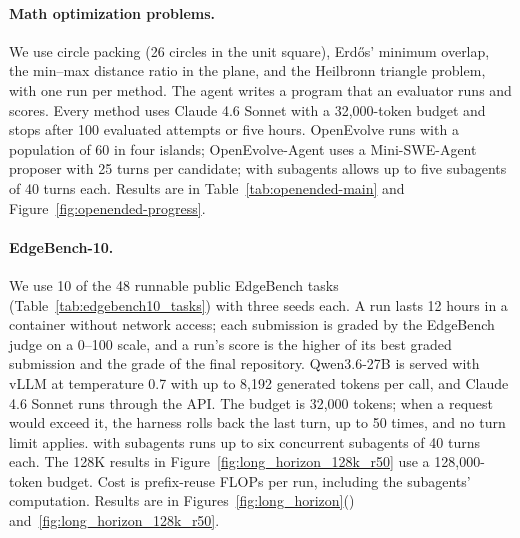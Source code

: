 \paragraph{Math optimization problems.}
We use circle packing (26 circles in the unit square), Erd\H{o}s' minimum overlap, the min--max distance ratio in the plane, and the Heilbronn triangle problem, with one run per method. The agent writes a program that an evaluator runs and scores. Every method uses Claude 4.6 Sonnet with a 32{,}000-token budget and stops after 100 evaluated attempts or five hours. OpenEvolve runs with a population of 60 in four islands; OpenEvolve-Agent uses a Mini-SWE-Agent proposer with 25 turns per candidate; \ours{} with subagents allows up to five subagents of 40 turns each. Results are in Table~\ref{tab:openended-main} and Figure~\ref{fig:openended-progress}.

\paragraph{EdgeBench-10.}\label{app:open_single}
We use 10 of the 48 runnable public EdgeBench tasks (Table~\ref{tab:edgebench10_tasks}) with three seeds each. A run lasts 12 hours in a container without network access; each submission is graded by the EdgeBench judge on a 0--100 scale, and a run's score is the higher of its best graded submission and the grade of the final repository. Qwen3.6-27B is served with vLLM at temperature 0.7 with up to 8{,}192 generated tokens per call, and Claude 4.6 Sonnet runs through the API. The budget is 32{,}000 tokens; when a request would exceed it, the harness rolls back the last turn, up to 50 times, and no turn limit applies. \ours{} with subagents runs up to six concurrent subagents of 40 turns each. The 128K results in Figure~\ref{fig:long_horizon_128k_r50} use a 128{,}000-token budget. Cost is prefix-reuse FLOPs per run, including the subagents' computation. Results are in Figures~\ref{fig:long_horizon}() and~\ref{fig:long_horizon_128k_r50}.


